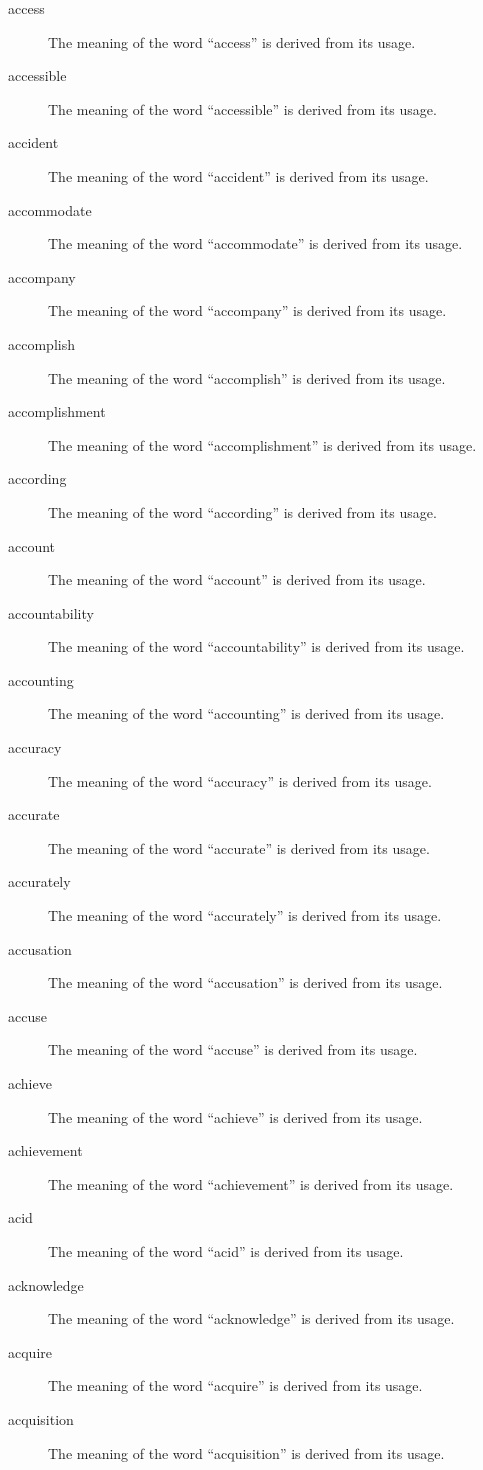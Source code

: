 \documentclass[12pt, letterpaper]{memoir}
\begin{document}
\begin{description}
\item[access] The meaning of the word ``access'' is derived from its usage.
\item[accessible] The meaning of the word ``accessible'' is derived from its usage.
\item[accident] The meaning of the word ``accident'' is derived from its usage.
\item[accommodate] The meaning of the word ``accommodate'' is derived from its usage.
\item[accompany] The meaning of the word ``accompany'' is derived from its usage.
\item[accomplish] The meaning of the word ``accomplish'' is derived from its usage.
\item[accomplishment] The meaning of the word ``accomplishment'' is derived from its usage.
\item[according] The meaning of the word ``according'' is derived from its usage.
\item[account] The meaning of the word ``account'' is derived from its usage.
\item[accountability] The meaning of the word ``accountability'' is derived from its usage.
\item[accounting] The meaning of the word ``accounting'' is derived from its usage.
\item[accuracy] The meaning of the word ``accuracy'' is derived from its usage.
\item[accurate] The meaning of the word ``accurate'' is derived from its usage.
\item[accurately] The meaning of the word ``accurately'' is derived from its usage.
\item[accusation] The meaning of the word ``accusation'' is derived from its usage.
\item[accuse] The meaning of the word ``accuse'' is derived from its usage.
\item[achieve] The meaning of the word ``achieve'' is derived from its usage.
\item[achievement] The meaning of the word ``achievement'' is derived from its usage.
\item[acid] The meaning of the word ``acid'' is derived from its usage.
\item[acknowledge] The meaning of the word ``acknowledge'' is derived from its usage.
\item[acquire] The meaning of the word ``acquire'' is derived from its usage.
\item[acquisition] The meaning of the word ``acquisition'' is derived from its usage.

\end{description}
\end{document}
